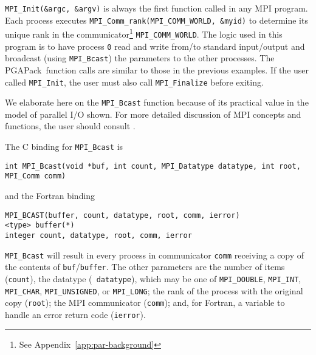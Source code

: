 \documentclass{report}
\newcommand{\pga}{PGAPack}
\begin{document}
\begin{sloppypar}
{\tt MPI\_Init(\&argc, \&argv)} is always the first function called in any MPI
program.  Each process executes {\tt MPI\_Comm\_rank(MPI\_COMM\_WORLD,
\&myid)} to determine its unique rank in the communicator\footnote{See
Appendix~\ref{app:par-background}} {\tt MPI\_COMM\_WORLD}.  The logic used in
this program is to have process {\tt 0} read and write from/to standard
input/output and broadcast (using {\tt MPI\_Bcast}) the parameters to the
other processes.  The \pga\ function calls are similar to those in the
previous examples.  If the user called {\tt MPI\_Init}, the user must also
call {\tt MPI\_Finalize} before exiting.
\end{sloppypar}

We elaborate here on the {\tt MPI\_Bcast} function because of its practical
value in the model of parallel I/O shown. For more detailed discussion of MPI
concepts and functions, the user should consult \cite{MPI-final,GrLuSk94}.

The C binding for {\tt MPI\_Bcast} is
\begin{verbatim}
int MPI_Bcast(void *buf, int count, MPI_Datatype datatype, int root, MPI_Comm comm)
\end{verbatim}
and the Fortran binding
\begin{verbatim}
MPI_BCAST(buffer, count, datatype, root, comm, ierror)
<type> buffer(*)
integer count, datatype, root, comm, ierror
\end{verbatim}
{\tt MPI\_Bcast} will result in every process in communicator {\tt comm}
receiving a copy of the contents of {\tt *buf}/{\tt buffer}.  The other
parameters are the number of items ({\tt count}), the datatype ({\tt
datatype}), which may be one of 
{\tt MPI\_DOUBLE},
{\tt MPI\_INT},
{\tt MPI\_CHAR},
{\tt MPI\_UNSIGNED},
or {\tt MPI\_LONG};
the rank of the process with the original copy ({\tt root}); the MPI
communicator ({\tt comm}); and, for Fortran, a variable to handle an error
return code ({\tt ierror}).
\end{document}
